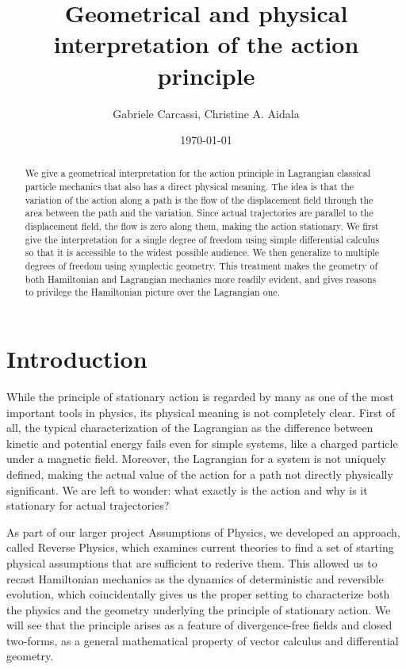 \documentclass[10pt,twocolumn, nofootinbib]{revtex4-2}
\begin{document}
\title{Geometrical and physical interpretation of the action principle}
\author{Gabriele Carcassi, Christine A. Aidala}

\date{\today}


\begin{abstract}
We give a geometrical interpretation for the action principle in Lagrangian classical particle mechanics that also has a direct physical meaning. The idea is that the variation of the action along a path is the flow of the displacement field through the area between the path and the variation. Since actual trajectories are parallel to the displacement field, the flow is zero along them, making the action stationary. We first give the interpretation for a single degree of freedom using simple differential calculus so that it is accessible to the widest possible audience. We then generalize to multiple degrees of freedom using symplectic geometry. This treatment makes the geometry of both Hamiltonian and Lagrangian mechanics more readily evident, and gives reasons to privilege the Hamiltonian picture over the Lagrangian one.
\end{abstract}

\maketitle

\section{Introduction}

While the principle of stationary action is regarded by many as one of the most important tools in physics, its physical meaning is not completely clear. First of all, the typical characterization of the Lagrangian as the difference between kinetic and potential energy fails even for simple systems, like a charged particle under a magnetic field. Moreover, the Lagrangian for a system is not uniquely defined, making the actual value of the action for a path not directly physically significant.  We are left to wonder: what exactly is the action and why is it stationary for actual trajectories?

As part of our larger project Assumptions of Physics, we developed an approach, called Reverse Physics, which examines current theories to find a set of starting physical assumptions that are sufficient to rederive them. This allowed us to recast Hamiltonian mechanics as the dynamics of deterministic and reversible evolution, which coincidentally gives us the proper setting to characterize both the physics and the geometry underlying the principle of stationary action. We will see that the principle arises as a feature of divergence-free fields and closed two-forms, as a general mathematical property of vector calculus and differential geometry.
\end{document}
